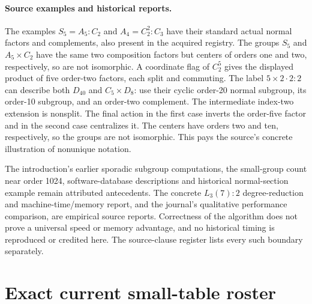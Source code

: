 \documentclass[11pt]{article}
\begin{document}
\paragraph{Source examples and historical reports.}
The examples $S_5=A_5:C_2$ and $A_4=C_2^2:C_3$ have their standard actual
normal factors and complements, also present in the acquired registry.
The groups $S_5$ and $A_5\times C_2$ have the same two composition
factors but centers of orders one and two, respectively, so are not
isomorphic. A coordinate flag of $C_2^5$ gives the displayed product of
five order-two factors, each split and commuting.
The label $5\times2\mathbin{\cdot}2:2$ can describe both $D_{40}$ and
$C_5\times D_8$: use their cyclic order-20 normal subgroup, its order-10
subgroup, and an order-two complement. The intermediate index-two
extension is nonsplit. The final action in the first case inverts the
order-five factor and in the second case centralizes it. The centers have
orders two and ten, respectively, so the groups are not isomorphic.
This pays the source's concrete illustration of nonunique notation.

The introduction's earlier sporadic subgroup computations, the small-group
count near order 1024, software-database descriptions and historical
normal-section example remain attributed antecedents. The concrete
$L_3(7):2$ degree-reduction and machine-time/memory report, and the journal's
qualitative performance comparison, are empirical source reports.
Correctness of the algorithm does not prove a universal speed or memory
advantage, and no historical timing is reproduced or credited here.
The source-clause register lists every such boundary separately.

\clearpage
\section*{Exact current small-table roster}
\small

\normalsize
\end{document}
